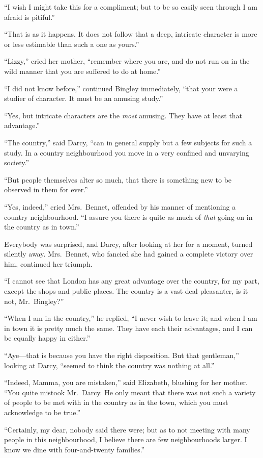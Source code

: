 ``I wish I might take this for a compliment; but to be so easily
seen through I am afraid is pitiful.''

``That is as it happens.  It does not follow that a deep, intricate
character is more or less estimable than such a one as yours.''

``Lizzy,'' cried her mother, ``remember where you are, and do not
run on in the wild manner that you are suffered to do at home.''

``I did not know before,'' continued Bingley immediately, ``that
your were a studier of character.  It must be an amusing study.''

``Yes, but intricate characters are the \emph{most} amusing.  They
have at least that advantage.''

``The country,'' said Darcy, ``can in general supply but a few
subjects for such a study.  In a country neighbourhood you move
in a very confined and unvarying society.''

``But people themselves alter so much, that there is something
new to be observed in them for ever.''

``Yes, indeed,'' cried Mrs.\ Bennet, offended by his manner of
mentioning a country neighbourhood.  ``I assure you there is
quite as much of \emph{that} going on in the country as in town.''

Everybody was surprised, and Darcy, after looking at her for a
moment, turned silently away.  Mrs.\ Bennet, who fancied she
had gained a complete victory over him, continued her triumph.

``I cannot see that London has any great advantage over the
country, for my part, except the shops and public places.  The
country is a vast deal pleasanter, is it not, Mr.\ Bingley?''

``When I am in the country,'' he replied, ``I never wish to leave it;
and when I am in town it is pretty much the same.  They have
each their advantages, and I can be equally happy in either.''

``Aye---that is because you have the right disposition.  But that
gentleman,'' looking at Darcy, ``seemed to think the country was
nothing at all.''

``Indeed, Mamma, you are mistaken,'' said Elizabeth, blushing for
her mother.  ``You quite mistook Mr.\ Darcy.  He only meant that
there was not such a variety of people to be met with in the
country as in the town, which you must acknowledge to be
true.''

``Certainly, my dear, nobody said there were; but as to not
meeting with many people in this neighbourhood, I believe
there are few neighbourhoods larger.  I know we dine with
four-and-twenty families.''


